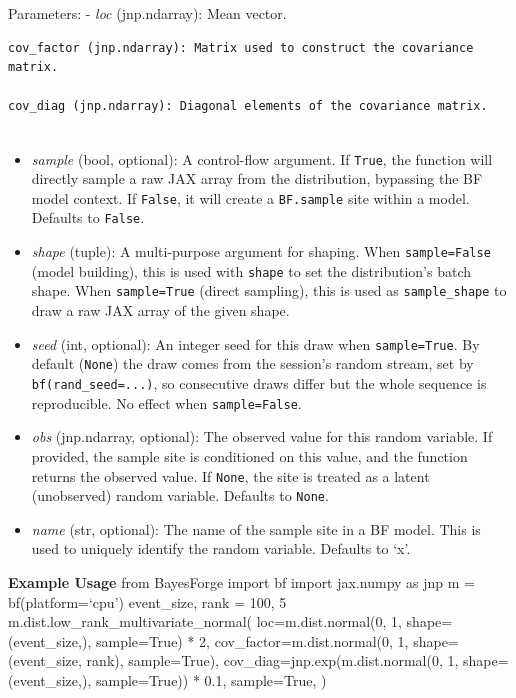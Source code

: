 \documentclass[
  letterpaper,
  DIV=11,
  numbers=noendperiod]{scrartcl}
\begin{document}
Parameters: - \emph{loc} (jnp.ndarray): Mean vector.

\begin{verbatim}
cov_factor (jnp.ndarray): Matrix used to construct the covariance matrix.

cov_diag (jnp.ndarray): Diagonal elements of the covariance matrix.
    
\end{verbatim}

\begin{itemize}
\item
  \emph{sample} (bool, optional): A control-flow argument. If
  \texttt{True}, the function will directly sample a raw JAX array from
  the distribution, bypassing the BF model context. If \texttt{False},
  it will create a \texttt{BF.sample} site within a model. Defaults to
  \texttt{False}.
\item
  \emph{shape} (tuple): A multi-purpose argument for shaping. When
  \texttt{sample=False} (model building), this is used with
  \texttt{shape} to set the distribution's batch shape. When
  \texttt{sample=True} (direct sampling), this is used as
  \texttt{sample\_shape} to draw a raw JAX array of the given shape.
\item
  \emph{seed} (int, optional): An integer seed for this draw when
  \texttt{sample=True}. By default (\texttt{None}) the draw comes from
  the session's random stream, set by \texttt{bf(rand\_seed=...)}, so
  consecutive draws differ but the whole sequence is reproducible. No
  effect when \texttt{sample=False}.
\item
  \emph{obs} (jnp.ndarray, optional): The observed value for this random
  variable. If provided, the sample site is conditioned on this value,
  and the function returns the observed value. If \texttt{None}, the
  site is treated as a latent (unobserved) random variable. Defaults to
  \texttt{None}.
\item
  \emph{name} (str, optional): The name of the sample site in a BF
  model. This is used to uniquely identify the random variable. Defaults
  to `x'.
\end{itemize}

\textbf{Example Usage} from BayesForge import bf import jax.numpy as jnp
m = bf(platform=`cpu') event\_size, rank = 100, 5
m.dist.low\_rank\_multivariate\_normal( loc=m.dist.normal(0, 1,
shape=(event\_size,), sample=True) * 2, cov\_factor=m.dist.normal(0, 1,
shape=(event\_size, rank), sample=True),
cov\_diag=jnp.exp(m.dist.normal(0, 1, shape=(event\_size,),
sample=True)) * 0.1, sample=True, )
\end{document}
